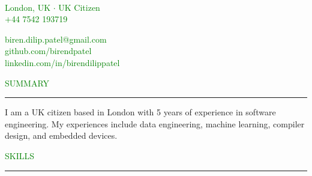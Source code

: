 \documentclass [
        11pt
] {article}
\begin{document}
\begin{multicols}{2}

\\
\noindent \textcolor{green}{London, UK $ \boldsymbol{\cdot} $ UK Citizen}\\
\noindent \textcolor{green}{$+$44 7542 193719}\\

\columnbreak

\hspace*{\fill} \noindent \textcolor{green}{biren.dilip.patel@gmail.com}\\
\hspace*{\fill} \noindent \textcolor{green}{github.com/birendpatel}\\
\hspace*{\fill} \noindent \textcolor{green}{linkedin.com/in/birendilippatel}

\end{multicols}


\noindent\textcolor{green}{SUMMARY \rule{16cm}{1pt}}

\vspace*{10pt}

\noindent I am a UK citizen based in London with 5 years of experience in 
software engineering.
My experiences include data engineering, machine learning, compiler design,
and embedded devices.

\vspace*{10pt}



\noindent\textcolor{green}{SKILLS \rule{17cm}{1pt}}
\end{document}
